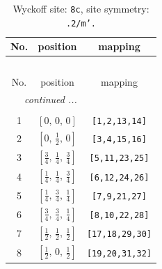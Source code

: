 \documentclass[fleqn,8pt]{jsarticle}
\begin{document}
\renewcommand{\arraystretch}{1.2}
\begin{longtable}{ccc}
\caption{Wyckoff site: {\tt 8c}, site symmetry: {\tt .2/m'.}}
 \\
 \hline \hline
No. & position & mapping \\ \hline \endfirsthead

\multicolumn{2}{l}{\tablename\ \thetable{}} \\
 \hline \hline
No. & position & mapping \\ \hline \endhead

 \hline \hline
\multicolumn{2}{r}{\footnotesize\it continued ...} \\ \endfoot

 \hline \hline
\multicolumn{2}{r}{} \\ \endlastfoot

1 & $\left[ 0,\, 0,\, 0 \right]$ & {\tt [1,2,13,14]} \\ \hline
2 & $\left[ 0,\, \frac{1}{2},\, 0 \right]$ & {\tt [3,4,15,16]} \\ \hline
3 & $\left[ \frac{3}{4},\, \frac{1}{4},\, \frac{3}{4} \right]$ & {\tt [5,11,23,25]} \\ \hline
4 & $\left[ \frac{1}{4},\, \frac{1}{4},\, \frac{3}{4} \right]$ & {\tt [6,12,24,26]} \\ \hline
5 & $\left[ \frac{1}{4},\, \frac{3}{4},\, \frac{1}{4} \right]$ & {\tt [7,9,21,27]} \\ \hline
6 & $\left[ \frac{3}{4},\, \frac{3}{4},\, \frac{1}{4} \right]$ & {\tt [8,10,22,28]} \\ \hline
7 & $\left[ \frac{1}{2},\, \frac{1}{2},\, \frac{1}{2} \right]$ & {\tt [17,18,29,30]} \\ \hline
8 & $\left[ \frac{1}{2},\, 0,\, \frac{1}{2} \right]$ & {\tt [19,20,31,32]} \\
\end{longtable}
\renewcommand{\arraystretch}{1.2}
\end{document}

